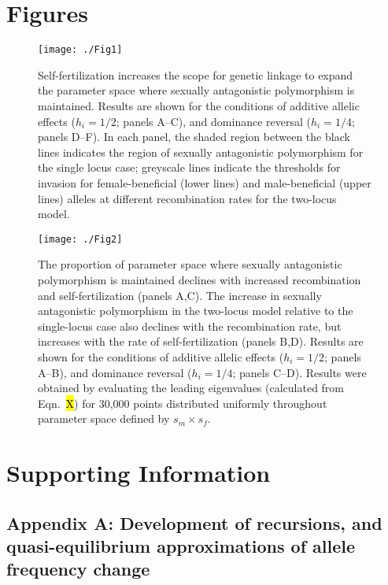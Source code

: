 \documentclass{article}
\begin{document}
\newpage{}

\section*{Figures}
 
\begin{figure}[!ht]
\texttt{[image: ./Fig1]}
\caption{Self-fertilization increases the scope for genetic linkage to expand the parameter space where sexually antagonistic polymorphism is maintained. Results are shown for the conditions of additive allelic effects ($h_i = 1/2$; panels A--C), and dominance reversal ($h_i = 1/4$; panels D--F). In each panel, the shaded region between the black lines indicates the region of sexually antagonistic polymorphism for the single locus case; greyscale lines indicate the thresholds for invasion for female-beneficial (lower lines) and male-beneficial (upper lines) alleles at different recombination rates for the two-locus model.}
\label{Fig:Fig1.pdf}
\end{figure}
\newpage{}


\begin{figure}[!ht]
\texttt{[image: ./Fig2]}
\caption{The proportion of parameter space where sexually antagonistic polymorphism is maintained declines with increased recombination and self-fertilization (panels A,C). The increase in sexually antagonistic polymorphism in the two-locus model relative to the single-locus case also declines with the recombination rate, but increases with the rate of self-fertilization (panels B,D). Results are shown for the conditions of additive allelic effects ($h_i = 1/2$; panels A--B), and dominance reversal ($h_i = 1/4$; panels C--D). Results were obtained by evaluating the leading eigenvalues (calculated from Eqn.~\hl{X}) for 30,000 points distributed uniformly throughout parameter space defined by $s_m \times s_f$.}
\label{Fig:Fig2.pdf}
\end{figure}
\newpage{}




\section*{Supporting Information}

\subsection*{Appendix A: Development of recursions, and quasi-equilibrium approximations of allele frequency change}
\renewcommand{\theequation}{A\arabic{equation}}
\end{document}
